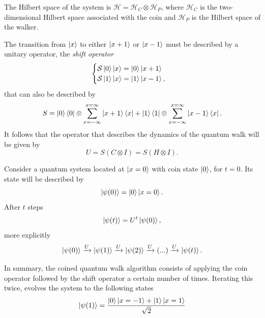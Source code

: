 \documentclass[../../dissertation.tex]{subfiles}
\begin{document}
The Hilbert space of the system is $\mathscr{H} = \mathscr{H}_{C} \otimes
\mathscr{H}_{P}$, where $\mathscr{H}_{C}$ is the two-dimensional Hilbert space
associated with the coin and $\mathscr{H}_P$ is the Hilbert space of the
walker.\par The transition from $\ket{x}$ to either $\ket{x+1}$ or $\ket{x-1}$
must be described by a unitary operator, the \textit{shift operator} 
\begin{equation}
	\begin{cases}
		\mathcal{S} \ket{0}\ket{x} = \ket{0}\ket{x+1}\\
		\mathcal{S} \ket{1}\ket{x} = \ket{1}\ket{x-1},
	\end{cases}
\end{equation}
that can also be described by
\begin{equation}
	S = \ket{0}\bra{0} \otimes \sum_{x=-\infty}^{x=\infty} \ket{x+1}\bra{x} + \ket{1}\bra{1}\otimes \sum_{x=-\infty}^{x=\infty} \ket{x-1}\bra{x}.
	\label{eq:coinedShiftOperator}
\end{equation}
It follows that the operator that describes the dynamics of the quantum walk
will be given by 
\begin{equation}
	U = S(C\otimes I) = S(H\otimes I). 
	\label{eq:coinedUnmarkedOperator}
\end{equation}\par
Consider a quantum system located at $\ket{x = 0}$ with coin state $\ket{0}$,
for $t=0$. Its state will be described by
\begin{equation}
	\ket{\psi(0)} = \ket{0}\ket{x=0}.
	\label{eq:coinedQWInitCond0}
\end{equation}
After $t$ steps 
\begin{equation}
	\ket{\psi(t)}=U^{t}\ket{\psi(0)},
\end{equation}
more explicitly
\begin{equation}
	\ket{\psi(0)}\xrightarrow[]{\text{$U$}}\ket{\psi(1)}\xrightarrow[]{\text{$U$}}\ket{\psi(2)}\xrightarrow[]{\text{$U$}} (...) \xrightarrow[]{\text{$U$}}\ket{\psi(t)}.
\end{equation}\par
In summary, the coined quantum walk algorithm consists of applying the coin
operator followed by the shift operator a certain number of times. Iterating
this twice, evolves the system to the following states
\begin{equation}
	\ket{\psi(1)} = \frac{\ket{0}\ket{x=-1}+\ket{1}\ket{x=1}}{\sqrt{2}}
\end{equation}
\end{document}
